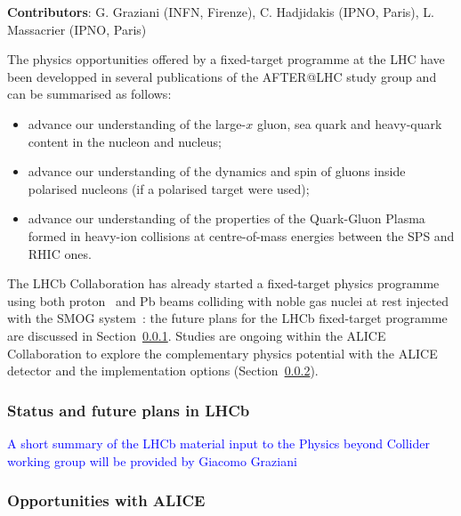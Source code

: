 \documentclass[../report.tex]{subfiles}
\begin{document}
\textbf{Contributors}: G. Graziani (INFN, Firenze), C. Hadjidakis (IPNO, Paris), L. Massacrier (IPNO, Paris)

The physics opportunities offered by a fixed-target programme at the LHC have been developped in several publications of the AFTER@LHC study group \cite{Brodsky:2012vg, Lansberg:Adv2015} and can be summarised as follows:
\begin{itemize}
\item advance our understanding of the large-$x$ gluon, sea quark and heavy-quark content in the nucleon and nucleus;
\item advance our understanding of the dynamics and spin of gluons inside polarised nucleons (if a polarised target were used);
\item advance our understanding of the properties of the Quark-Gluon Plasma formed in heavy-ion collisions at centre-of-mass energies between the SPS and RHIC ones.
\end{itemize}
The LHCb Collaboration has already started a fixed-target physics programme using both proton~\cite{Aaij:2018svt,Aaij:2018ogq} and Pb beams colliding with noble gas nuclei at rest injected with the SMOG system~\cite{SMOG}: the future plans for the LHCb fixed-target programme are discussed in Section~\ref{sec:FTLHCb}. Studies are ongoing within the ALICE Collaboration to explore the complementary physics potential with the ALICE detector and the implementation options (Section~\ref{sec:FTALICE}). 

\subsubsection{Status and future plans in LHCb}
\label{sec:FTLHCb}

\textcolor{blue}{A short summary of the LHCb material input to the Physics beyond Collider working group will be provided by Giacomo Graziani}

\subsubsection{Opportunities with ALICE}
\label{sec:FTALICE}
\end{document}
